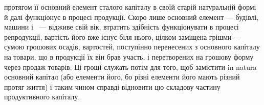 протягом її основний елемент сталого капіталу в своїй старій натуральній
формі й далі функціонує в процесі продукції. Скоро лише основний
елемент — будівлі, машини і~ — відживе свій вік, втратить здібність
функціонувати в процесі репродукції, вартість його вже існує біля нього,
цілком заміщена грішми — сумою грошових осадів, вартостей, поступінно
перенесених з основного капіталу на товари, що в продукції їх він брав
участь, і перетворених на грошову форму через продаж товарів. Ці гроші
служать потім для того, щоб замістити in natura основний капітал (або
елементи його, бо різні елементи його мають різний протяг життя) і таким
чином справді відновити цю складову частину продуктивного капіталу.
\parbreak{}  %
